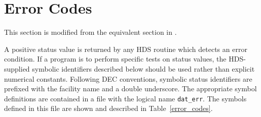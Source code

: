 \clearpage
\section {Error Codes}

This section is modified from the equivalent section in \cite{sun_92}.

A positive status value is returned by any HDS routine which detects an error
condition. If a program is to perform specific tests on status values, the
HDS-supplied symbolic identifiers described below should be used rather than
explicit numerical constants. Following DEC conventions, symbolic status
identifiers are prefixed with the facility name and a double underscore. The
appropriate symbol definitions are contained in a file with the logical name
{\tt dat\_err}. The symbols defined in this file are shown and described in
Table~\ref{error_codes}.

